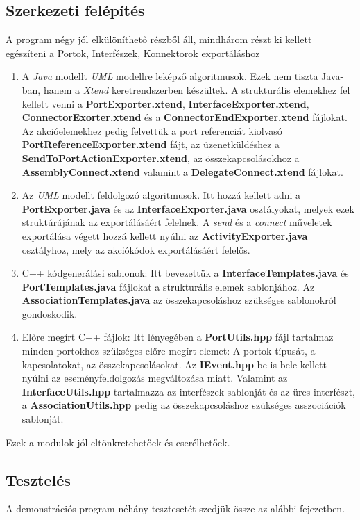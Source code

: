\documentclass[a4paper,12pt]{report}
\begin{document}
\subsection{Szerkezeti felépítés}
A program négy jól elkülöníthető részből áll, mindhárom részt ki kellett egészíteni a Portok, Interfészek, Konnektorok exportáláshoz

\begin{enumerate}
\item A \textit{Java} modellt \textit{UML} modellre leképző algoritmusok. Ezek nem tiszta Java-ban, hanem a \textit{Xtend} keretrendszerben készültek. A strukturális elemekhez fel kellett venni a \textbf{PortExporter.xtend}, \textbf{InterfaceExporter.xtend}, \textbf{ConnectorExorter.xtend} és a \textbf{ConnectorEndExporter.xtend} fájlokat. Az akcióelemekhez pedig felvettük a port referenciát kiolvasó \textbf{PortReferenceExporter.xtend} fájt, az üzenetküldéshez a \textbf{SendToPortActionExporter.xtend}, az összekapcsolásokhoz a \textbf{AssemblyConnect.xtend} valamint a \textbf{DelegateConnect.xtend} fájlokat.
\item Az \textit{UML} modellt feldolgozó algoritmusok. Itt hozzá kellett adni a  \textbf{PortExporter.java} és az \textbf{InterfaceExporter.java} osztályokat, melyek ezek struktúrájának az exportálásáért felelnek. A \textit{send} és a \textit{connect} műveletek exportálása végett hozzá kellett nyúlni az \textbf{ActivityExporter.java} osztályhoz, mely az akciókódok exportálásáért felelős.
\item C++ kódgenerálási sablonok: Itt bevezettük a \textbf{InterfaceTemplates.java} és \textbf{PortTemplates.java} fájlokat a strukturális elemek sablonjához. Az \textbf{AssociationTemplates.java} az összekapcsoláshoz szükséges sablonokról gondoskodik.
\item Előre megírt C++ fájlok: Itt lényegében a \textbf{PortUtils.hpp} fájl tartalmaz minden portokhoz szükséges előre megírt elemet: A portok típusát, a kapcsolatokat, az összekapcsolásokat. Az \textbf{IEvent.hpp}-be is bele kellett nyúlni az eseményfeldolgozás megváltozása miatt. Valamint az \textbf{InterfaceUtils.hpp} tartalmazza az interfészek sablonját és az üres interfészt, a \textbf{AssociationUtils.hpp} pedig az összekapcsoláshoz szükséges asszociációk sablonját.
\end{enumerate}

Ezek a modulok jól eltönkretehetőek és cserélhetőek. 

\subsection{Tesztelés}
A demonstrációs program néhány tesztesetét szedjük össze az alábbi fejezetben.
\end{document}
